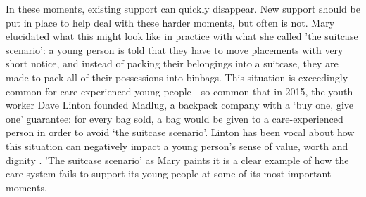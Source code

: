 In these moments, existing support can quickly disappear. New support should be put in place to help deal with these harder moments, but often is not. Mary elucidated what this might look like in practice with what she called 'the suitcase scenario': a young person is told that they have to move placements with very short notice, and instead of packing their belongings into a suitcase, they are made to pack all of their  possessions into binbags. This situation is exceedingly common for care-experienced young people - so common that in 2015, the youth worker Dave Linton founded Madlug, a backpack company with a ‘buy one, give one’ guarantee: for every bag sold, a bag would be given to a care-experienced person in order to avoid ‘the suitcase scenario’. Linton has been vocal about how this situation can negatively impact a young person's sense of value, worth and dignity \citep{noauthor_madlug_nodate}. 'The suitcase scenario' as Mary paints it is a clear example of how the care system fails to support its young people at some of its most important moments.

